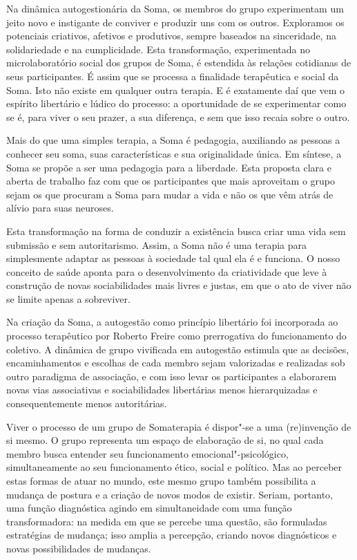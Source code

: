 Na dinâmica autogestionária da Soma, os membros do grupo experimentam um
jeito novo e instigante de conviver e produzir uns com os outros.
Exploramos os potenciais criativos, afetivos e produtivos, sempre
baseados na sinceridade, na solidariedade e na cumplicidade. Esta
transformação, experimentada no microlaboratório social dos grupos de
Soma, é estendida às relações cotidianas de seus participantes. É assim
que se processa a finalidade terapêutica e social da Soma. Isto não
existe em qualquer outra terapia. E é exatamente daí que vem o espírito
libertário e lúdico do processo: a oportunidade de se experimentar como
se é, para viver o seu prazer, a sua diferença, e sem que isso recaia
sobre o outro.

Mais do que uma simples terapia, a Soma é pedagogia, auxiliando as
pessoas a conhecer seu soma, suas características e sua originalidade
única. Em síntese, a Soma se propõe a ser uma pedagogia para a
liberdade. Esta proposta clara e aberta de trabalho faz com que os
participantes que mais aproveitam o grupo sejam os que procuram a Soma
para mudar a vida e não os que vêm atrás de alívio para suas neuroses.

Esta transformação na forma de conduzir a existência busca criar uma
vida sem submissão e sem autoritarismo. Assim, a Soma não é uma terapia
para simplesmente adaptar as pessoas à sociedade tal qual ela é e
funciona. O nosso conceito de saúde aponta para o desenvolvimento da
criatividade que leve à construção de novas sociabilidades mais livres e
justas, em que o ato de viver não se limite apenas a sobreviver.

Na criação da Soma, a autogestão como princípio libertário foi
incorporada ao processo terapêutico por Roberto Freire como prerrogativa
do funcionamento do coletivo. A dinâmica de grupo vivificada em
autogestão estimula que as decisões, encaminhamentos e escolhas de cada
membro sejam valorizadas e realizadas sob outro paradigma de associação,
e com isso levar os participantes a elaborarem novas vias associativas e
sociabilidades libertárias menos hierarquizadas e consequentemente menos
autoritárias.

Viver o processo de um grupo de Somaterapia é dispor"-se a uma
(re)invenção de si mesmo. O grupo representa um espaço de elaboração de
si, no qual cada membro busca entender seu funcionamento
emocional"-psicológico, simultaneamente ao seu funcionamento ético,
social e político. Mas ao perceber estas formas de atuar no mundo, este
mesmo grupo também possibilita a mudança de postura e a criação de novos
modos de existir. Seriam, portanto, uma função diagnóstica agindo em
simultaneidade com uma função transformadora: na medida em que se
percebe uma questão, são formuladas estratégias de mudança; isso amplia
a percepção, criando novos diagnósticos e novas possibilidades de
mudanças.

